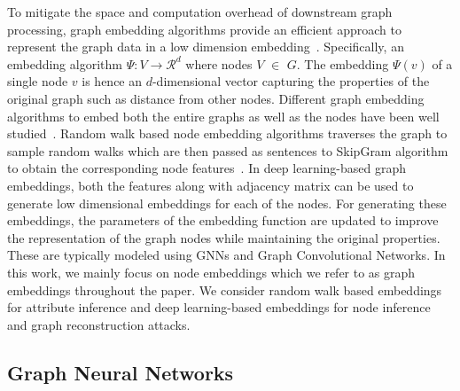 To mitigate the space and computation overhead of downstream graph processing, graph embedding algorithms provide an efficient approach to represent the graph data in a low dimension embedding~\cite{tutorial}.
Specifically, an embedding algorithm $\Psi: V \rightarrow \mathcal{R}^d$ where nodes $V$ $\in$ $G$.
The embedding $\Psi(v)$ of a single node $v$ is hence an $d$-dimensional vector capturing the properties of the original graph such as distance from other nodes.
Different graph embedding algorithms to embed both the entire graphs as well as the nodes have been well studied~\cite{survey}.
Random walk based node embedding algorithms traverses the graph to sample random walks which are then passed as sentences to SkipGram algorithm to obtain the corresponding node features~\cite{node2vec,deepwalk}.
In deep learning-based graph embeddings, both the features along with adjacency matrix can be used to generate low dimensional embeddings for each of the nodes.
For generating these embeddings, the parameters of the embedding function are updated to improve the representation of the graph nodes while maintaining the original properties.
These are typically modeled using GNNs and Graph Convolutional Networks.
In this work, we mainly focus on node embeddings which we refer to as graph embeddings throughout the paper.
We consider random walk based embeddings for attribute inference and deep learning-based embeddings for node inference and graph reconstruction attacks.


\subsection{Graph Neural Networks}

